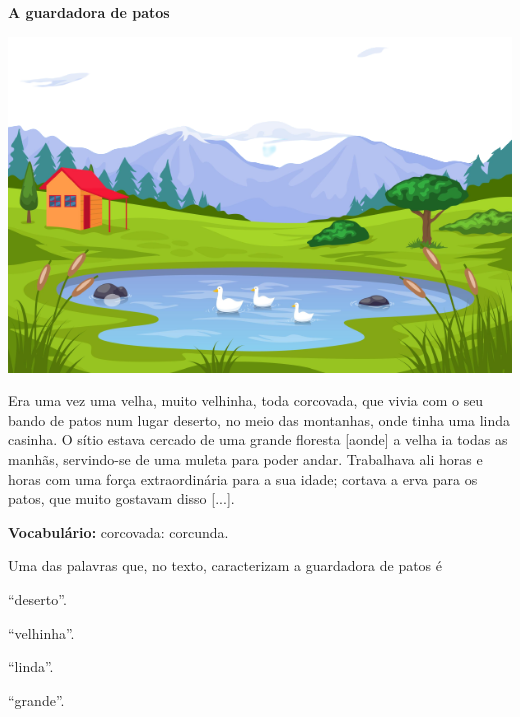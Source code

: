 \begin{myquote}
\textbf{A guardadora de patos}

\includegraphics[width=\textwidth]{./media/image23a.png}

Era uma vez uma velha, muito velhinha, toda corcovada, que vivia com o
seu bando de patos num lugar deserto, no meio das montanhas, onde tinha
uma linda casinha. O sítio estava cercado de uma grande floresta [aonde] a
velha ia todas as manhãs, servindo-se de uma muleta para poder andar.
Trabalhava ali horas e horas com uma força extraordinária para a sua
idade; cortava a erva para os patos, que muito gostavam disso
{[}...{]}.


\begin{small}
\textbf{Vocabulário:} corcovada: corcunda.
\end{small}
\end{myquote}

Uma das palavras que, no texto, caracterizam a guardadora de patos é

\begin{escolha}[itemsep=-5pt]
\item ``deserto''.

\item ``velhinha''.

\item ``linda''.

\item ``grande''.
\end{escolha}



